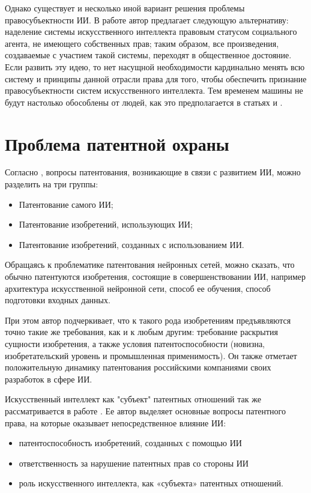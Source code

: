 Однако существует и несколько иной вариант решения проблемы правосубъектности ИИ. В работе
\cite{mor} автор предлагает следующую альтернативу: наделение системы искусственного интеллекта
правовым статусом социального агента, не имеющего собственных прав; таким образом, все произведения,
создаваемые с участием такой системы, переходят в общественное достояние. Если развить эту идею, то
нет насущной необходимости кардинально менять всю систему и принципы данной отрасли права для того,
чтобы обеспечить признание правосубъектности систем искусственного интеллекта. Тем временем машины
не будут настолько обособлены от людей, как это предполагается в статьях \cite{chel} и \cite{probs}.



\newpage

\section{Проблема патентной охраны}
Согласно \cite{trans}, вопросы патентования, возникающие в связи с развитием ИИ, можно разделить на три группы:

\begin{itemize}
\item Патентование самого ИИ;
\item Патентование изобретений, использующих ИИ;
\item Патентование изобретений, созданных с использованием ИИ.
\end{itemize}

Обращаясь к проблематике патентования нейронных сетей, можно сказать,
что обычно патентуются изобретения, состоящие в совершенствовании ИИ, например
архитектура искусственной нейронной сети, способ ее обучения, способ подготовки
входных данных.

При этом автор \cite{trans} подчеркивает, что к такого рода изобретениям предъявляются
точно такие же требования, как и к любым другим: требование раскрытия сущности
изобретения, а также условия патентоспособности (новизна, изобретательский уровень
и промышленная применимость). Он также отметает положительную динамику патентования
российскими компаниями своих разработок в сфере ИИ.

Искусственный интеллект как "субъект" патентных отношений так же рассматривается в работе \cite{reg}.
Ее автор выделяет основные вопросы патентного права, на которые оказывает непосредственное влияние ИИ:

\begin{itemize}
\item патентоспособность изобретений, созданных с помощью ИИ
\item ответственность за нарушение патентных прав со стороны ИИ
\item роль искусственного интеллекта, как «субъекта» патентных отношений.
\end{itemize}


